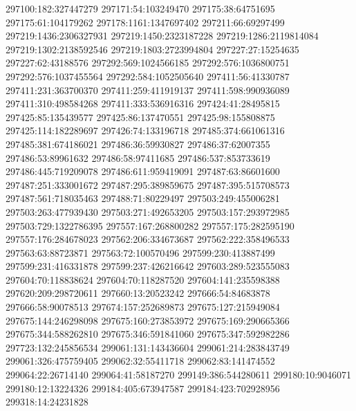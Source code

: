 297100:182:327447279
297171:54:103249470
297175:38:64751695
297175:61:104179262
297178:1161:1347697402
297211:66:69297499
297219:1436:2306327931
297219:1450:2323187228
297219:1286:2119814084
297219:1302:2138592546
297219:1803:2723994804
297227:27:15254635
297227:62:43188576
297292:569:1024566185
297292:576:1036800751
297292:576:1037455564
297292:584:1052505640
297411:56:41330787
297411:231:363700370
297411:259:411919137
297411:598:990936089
297411:310:498584268
297411:333:536916316
297424:41:28495815
297425:85:135439577
297425:86:137470551
297425:98:155808875
297425:114:182289697
297426:74:133196718
297485:374:661061316
297485:381:674186021
297486:36:59930827
297486:37:62007355
297486:53:89961632
297486:58:97411685
297486:537:853733619
297486:445:719209078
297486:611:959419091
297487:63:86601600
297487:251:333001672
297487:295:389859675
297487:395:515708573
297487:561:718035463
297488:71:80229497
297503:249:455006281
297503:263:477939430
297503:271:492653205
297503:157:293972985
297503:729:1322786395
297557:167:268800282
297557:175:282595190
297557:176:284678023
297562:206:334673687
297562:222:358496533
297563:63:88723871
297563:72:100570496
297599:230:413887499
297599:231:416331878
297599:237:426216642
297603:289:523555083
297604:70:118838624
297604:70:118287520
297604:141:235598388
297620:209:298720611
297660:13:20523242
297666:54:84683878
297666:58:90078513
297674:157:252689873
297675:127:215949084
297675:144:246298098
297675:160:273853972
297675:169:290665366
297675:344:588262810
297675:346:591841060
297675:347:592982286
297723:132:245856534
299061:131:143436604
299061:214:283843749
299061:326:475759405
299062:32:55411718
299062:83:141474552
299064:22:26714140
299064:41:58187270
299149:386:544280611
299180:10:9046071
299180:12:13224326
299184:405:673947587
299184:423:702928956
299318:14:24231828

